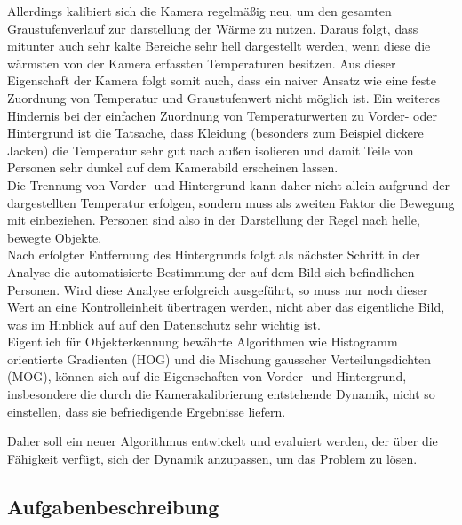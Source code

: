 Allerdings kalibiert sich die Kamera regelmäßig neu, um den gesamten Graustufenverlauf zur darstellung der Wärme zu nutzen. Daraus folgt, dass mitunter auch sehr kalte Bereiche sehr hell dargestellt werden, wenn diese die wärmsten von der Kamera erfassten Temperaturen besitzen.
Aus dieser Eigenschaft der Kamera folgt somit auch, dass ein naiver Ansatz wie eine feste Zuordnung von Temperatur und Graustufenwert nicht möglich ist. Ein weiteres Hindernis bei der einfachen Zuordnung von Temperaturwerten zu Vorder- oder Hintergrund ist die Tatsache, dass Kleidung (besonders zum Beispiel dickere Jacken) die Temperatur sehr gut nach außen isolieren und damit Teile von Personen sehr dunkel auf dem Kamerabild erscheinen lassen.\\
Die Trennung von Vorder- und Hintergrund kann daher nicht allein aufgrund der dargestellten Temperatur erfolgen, sondern muss als zweiten Faktor die Bewegung mit einbeziehen.
Personen sind also in der Darstellung der Regel nach helle, bewegte Objekte.\\
Nach erfolgter Entfernung des Hintergrunds folgt als nächster Schritt in der Analyse die automatisierte Bestimmung der auf dem Bild sich befindlichen Personen.
Wird diese Analyse erfolgreich ausgeführt, so muss nur noch dieser Wert an eine Kontrolleinheit übertragen werden, nicht aber das eigentliche Bild, was im Hinblick auf auf den Datenschutz sehr wichtig ist.\\
Eigentlich für Objekterkennung bewährte Algorithmen wie Histogramm orientierte Gradienten (HOG)\cite{Dalal05histogramsof} und die Mischung gausscher Verteilungsdichten (MOG)\cite{DBLP:conf/focs/Dasgupta99}, können sich auf die Eigenschaften von Vorder- und Hintergrund, insbesondere die durch die Kamerakalibrierung entstehende Dynamik, nicht so einstellen, dass sie befriedigende Ergebnisse liefern.

Daher soll ein neuer Algorithmus entwickelt und evaluiert werden, der über die Fähigkeit verfügt, sich der Dynamik anzupassen, um das Problem zu lösen.\\


\subsection{Aufgabenbeschreibung}
\label{sec:aufgabenbeschreibung}

